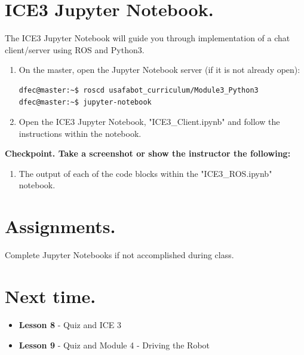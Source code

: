 \documentclass{handout}
\begin{document}
\section{ICE3 Jupyter Notebook.}
The ICE3 Jupyter Notebook will guide you through implementation of a chat client/server using ROS and Python3.

\begin{enumerate}\setlength\itemsep{1em}
	\item On the master, open the Jupyter Notebook server (if it is not already open):
\begin{lstlisting}[language=bash]
dfec@master:~$ roscd usafabot_curriculum/Module3_Python3
dfec@master:~$ jupyter-notebook
\end{lstlisting}
	
	\item Open the ICE3 Jupyter Notebook, "ICE3\_Client.ipynb" and follow the instructions within the notebook. 
\end{enumerate}

\textbf{Checkpoint. Take a screenshot or show the instructor the following:}
\begin{enumerate}
	\item The output of each of the code blocks within the "ICE3\_ROS.ipynb" notebook.
\end{enumerate}

\section{Assignments.}
	\begin{todolist}
		\item Complete Jupyter Notebooks if not accomplished during class.
	\end{todolist}

\section{Next time.}
	\begin{itemize}
		\item \textbf{Lesson 8} - Quiz and ICE 3
		\item \textbf{Lesson 9} - Quiz and Module 4 - Driving the Robot
	\end{itemize}
\end{document}
